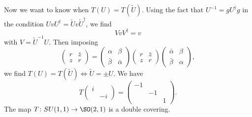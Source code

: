 Now we want to know when $T(U)=T(\tilde U)$. Using the fact that $U^{-1}=gU^{\dag}g$ in the condition $UvU^{\dag}=\tilde Uv\tilde U^{\dag}$, we find
\[
	VvV^{\dag}=v
\]
with $V=\tilde U^{-1}U$. Then imposing
\[
	\begin{pmatrix}
		r & \bar z \\z&r
	\end{pmatrix}=
	\begin{pmatrix}
		\alpha & \beta \\\bar\beta&\bar\alpha
	\end{pmatrix}
	\begin{pmatrix}
		r & \bar z \\z&r
	\end{pmatrix}
	\begin{pmatrix}
		\bar \alpha & \beta \\\bar\beta&\alpha
	\end{pmatrix},
\]
we find $T(U)=T(\tilde U)\Leftrightarrow \tilde U=\pm U$. We have
\[
	T\begin{pmatrix}
		i \\&-i
	\end{pmatrix}
	=
	\begin{pmatrix}
		-1 \\&-1\\&&1
	\end{pmatrix}.
\]
The map $T\colon SU(1,1)\to \SO(2,1)$ is a double covering.

